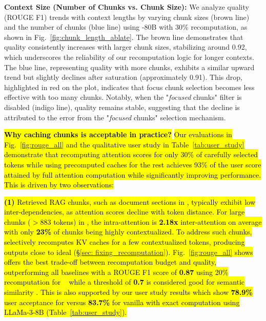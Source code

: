 


\textbf{Context Size (Number of Chunks vs. Chunk Size):} We analyze quality (ROUGE F1) trends with context lengths by varying chunk sizes (brown line) and the number of chunks (blue line) using \llama-80B with 30\% recomputation, as shown in Fig.~\ref{fig:chunk_length_ablate}. The brown line demonstrates that quality consistently increases with larger chunk sizes, stabilizing around 0.92, which underscores the reliability of our recomputation logic for longer contexts. The blue line, representing quality with more chunks, exhibits a similar upward trend but slightly declines after saturation (approximately 0.91). This drop, highlighted in red on the plot, indicates that focus chunk selection becomes less effective with too many chunks. Notably, when the "\textit{focused} chunks" filter is disabled (indigo line), quality remains stable, suggesting that the decline is attributed to the error from the "\textit{focused} chunks" selection mechanism.

\hl{\textbf{Why caching chunks is acceptable in practice?}}
\hl{Our evaluations in Fig.~\ref{fig:rouge_all} and the qualitative user study in Table~\ref{tab:user_study} demonstrate that recomputing attention scores for only 30\% of carefully selected tokens while using precomputed caches for the rest achieves 93\% of the user score attained by full attention computation while significantly improving performance. This is driven by two observations:}

\hl{\noindent\textbf{(1)} Retrieved RAG chunks, such as document sections in \X, typically exhibit low inter-dependencies, as attention scores decline with token distance. For large chunks ($>$883 tokens) in \X, the intra-attention is \textbf{2.18x} inter-attention on average with only \textbf{23\%} of chunks being highly contextualized. To address such chunks, \sys selectively recomputes KV caches for a few contextualized tokens, producing outputs close to ideal (\S\ref{sec: fixing_recomputation}). Fig.~\ref{fig:rouge_all} shows \sys offers the best trade-off between recomputation budget and quality, outperforming all baselines with a ROUGE F1 score of \textbf{0.87} using 20\% recomputation for \X~ while a threshold of \textbf{0.7} is considered good for semantic similarity \cite{li-etal-2024-traq}. This is also supported by our user study results which show \textbf{78.9\%} user
acceptance for \sys versus \textbf{83.7\%} for vanilla \vllm 
with exact computation using LLaMa-3-8B (Table~\ref{tab:user_study}).
}
%

